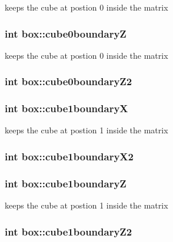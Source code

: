 keeps the cube at postion 0 inside the matrix \hypertarget{classbox_a90c20bbb34a5a9ae744e3fe77bf399d6}{
\subsubsection[{cube0boundary\-Z}]{\setlength{\rightskip}{0pt plus 5cm}int box\-::cube0boundary\-Z}}\label{classbox_a90c20bbb34a5a9ae744e3fe77bf399d6}
keeps the cube at postion 0 inside the matrix \hypertarget{classbox_a72efab0f58db398d43382cf8156f45f1}{
\subsubsection[{cube0boundary\-Z2}]{\setlength{\rightskip}{0pt plus 5cm}int box\-::cube0boundary\-Z2}}\label{classbox_a72efab0f58db398d43382cf8156f45f1}
\hypertarget{classbox_a977f1c22d1535732f20140b150d1bedf}{
\subsubsection[{cube1boundary\-X}]{\setlength{\rightskip}{0pt plus 5cm}int box\-::cube1boundary\-X}}\label{classbox_a977f1c22d1535732f20140b150d1bedf}
keeps the cube at postion 1 inside the matrix \hypertarget{classbox_a8f9f43fe283022beea21a5da3f7e31bd}{
\subsubsection[{cube1boundary\-X2}]{\setlength{\rightskip}{0pt plus 5cm}int box\-::cube1boundary\-X2}}\label{classbox_a8f9f43fe283022beea21a5da3f7e31bd}
\hypertarget{classbox_a061c1833454d8d4fc9c706b60259315b}{
\subsubsection[{cube1boundary\-Z}]{\setlength{\rightskip}{0pt plus 5cm}int box\-::cube1boundary\-Z}}\label{classbox_a061c1833454d8d4fc9c706b60259315b}
keeps the cube at postion 1 inside the matrix \hypertarget{classbox_a2db514751a0641e59c25473615eb165b}{
\subsubsection[{cube1boundary\-Z2}]{\setlength{\rightskip}{0pt plus 5cm}int box\-::cube1boundary\-Z2}}\label{classbox_a2db514751a0641e59c25473615eb165b}
